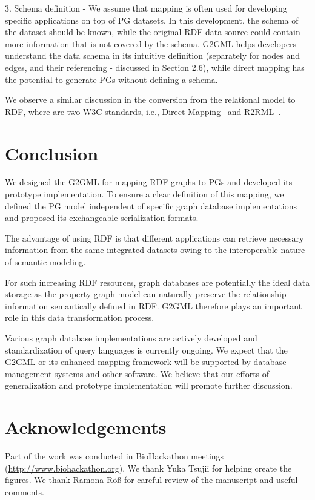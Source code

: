 \documentclass[runningheads]{llncs}
\begin{document}
3. Schema definition - We assume that mapping is often used for developing specific applications on top of PG datasets. In this development, the schema of the dataset should be known, while the original RDF data source could contain more information that is not covered by the schema. G2GML helps developers understand the data schema in its intuitive definition (separately for nodes and edges, and their referencing - discussed in Section 2.6), while direct mapping has the potential to generate PGs without defining a schema.

We observe a similar discussion in the conversion from the relational model to RDF, where are two W3C standards, i.e., Direct Mapping~\cite{dm} and R2RML~\cite{r2rml}.


\section{Conclusion}

We designed the G2GML for mapping RDF graphs to PGs and developed its prototype implementation. To ensure a clear definition of this mapping, we defined the PG model independent of specific graph database implementations and proposed its exchangeable serialization formats.

The advantage of using RDF is that different applications can retrieve necessary information from the same integrated datasets owing to the interoperable nature of semantic modeling.

For such increasing RDF resources, graph databases are potentially the ideal data storage as the property graph model can naturally preserve the relationship information semantically defined in RDF. G2GML therefore plays an important role in this data transformation process. 

Various graph database implementations are actively developed and standardization of query languages is currently ongoing. We expect that the G2GML or its enhanced mapping framework will be supported by database management systems and other software. We believe that our efforts of generalization and prototype implementation will promote further discussion.



\section*{Acknowledgements}
Part of the work was conducted in BioHackathon meetings (\url{http://www.biohackathon.org}). We thank Yuka Tsujii for helping create the figures. We thank Ramona Röß for careful review of the manuscript and useful comments.
\end{document}

